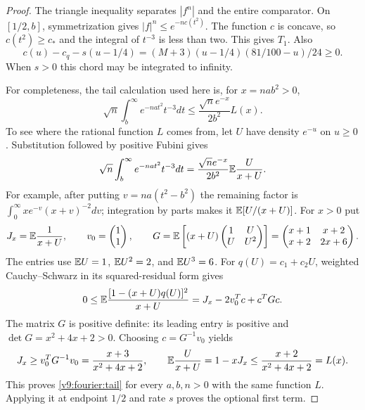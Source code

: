 \begin{proof}
The triangle inequality separates $|f^n|$ and the entire comparator.
On $[1/2,b]$, symmetrization gives $|f|^n\le e^{-nc(t^2)}$.
The function $c$ is concave, so $c(t^2)\ge c_*$ and the integral
of $t^{-3}$ is less than two. This gives $T_1$.
Also
\[
 c(u)-c_q-s(u-1/4)=(M+3)(u-1/4)(81/100-u)/24\ge0.
\]
When $s>0$ this chord may be integrated to infinity.

For completeness, the tail calculation used here is, for $x=na b^2>0$,
\begin{equation}\label{v9:fourier:tail}
 \sqrt n\int_b^\infty e^{-na t^2}t^{-3}dt
 \le\frac{\sqrt n e^{-x}}{2b^2}L(x).
\end{equation}
To see where the rational function $L$ comes from, let $U$ have density
$e^{-u}$ on $u\ge0$. Substitution followed by positive Fubini gives
\[
 \sqrt n\int_b^\infty e^{-na t^2}t^{-3}dt
 =\frac{\sqrt n e^{-x}}{2b^2}\mathbb E\frac{U}{x+U}.
\]
For example, after putting $v=na(t^2-b^2)$ the remaining factor is
$\int_0^\infty xe^{-v}(x+v)^{-2}dv$; integration by parts makes it
$\mathbb E[U/(x+U)]$. For $x>0$ put
\[
 J_x=\mathbb E\frac1{x+U},\qquad v_0=\begin{pmatrix}1\\1\end{pmatrix},\qquad
 G=\mathbb E\left[(x+U)\begin{pmatrix}1&U\\U&U^2\end{pmatrix}\right]
 =\begin{pmatrix}x+1&x+2\\x+2&2x+6\end{pmatrix}.
\]
The entries use $\mathbb E U=1$, $\mathbb E U^2=2$, and $\mathbb E U^3=6$.
For $q(U)=c_1+c_2U$, weighted Cauchy--Schwarz in its squared-residual
form gives
\[
 0\le\mathbb E\frac{[1-(x+U)q(U)]^2}{x+U}
 =J_x-2v_0^Tc+c^TGc.
\]
The matrix $G$ is positive definite: its leading entry is positive and
$\det G=x^2+4x+2>0$. Choosing $c=G^{-1}v_0$ yields
\[
 J_x\ge v_0^TG^{-1}v_0=\frac{x+3}{x^2+4x+2},\qquad
 \mathbb E\frac{U}{x+U}=1-xJ_x\le\frac{x+2}{x^2+4x+2}=L(x).
\]
This proves \eqref{v9:fourier:tail} for every $a,b,n>0$ with the same
function $L$. Applying it at endpoint
$1/2$ and rate $s$ proves the optional first term.


\end{proof}
